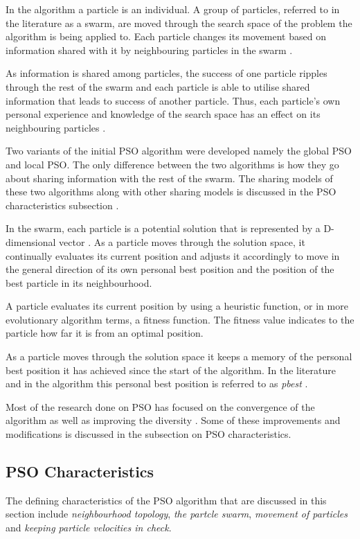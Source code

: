 In the algorithm a particle is an individual. A group of particles, referred to in the literature as a swarm,  are moved through the search space of the problem the algorithm is being applied to. Each particle changes its movement based on information shared with it by neighbouring particles in the swarm \cite{FundamentalSwarm,CompuIntelligenceIntro}. 

As information is shared among particles, the success of one particle ripples through the rest of the swarm and each particle is able to utilise shared information that leads to success of another particle. Thus, each particle's own personal experience and knowledge of the search space has an effect on its neighbouring particles \cite{FundamentalSwarm,CompuIntelligenceIntro}.

Two variants of the initial \gls{PSO} algorithm were developed namely the global \gls{PSO} and local \gls{PSO}. The only difference between the two algorithms is how they go about sharing information with the rest of the swarm. The sharing models of these two algorithms along with other sharing models is discussed in the \gls{PSO} characteristics subsection \cite{SOSwarm}.

In the swarm, each particle is a potential solution that is represented by a D-dimensional vector \cite{PSOHybridJobShop,PSOSelfHierarch}. As a particle moves through the solution space, it continually evaluates its current position and adjusts it accordingly to move in the general direction of its own personal best position and the position of the best particle in its neighbourhood. 

A particle evaluates its current position by using a heuristic function, or in more evolutionary algorithm terms, a fitness function. The fitness value indicates to the particle how far it is from an optimal position\cite{CompuIntelligenceIntro}. 

As a particle moves through the solution space it keeps a memory of the personal best position it has achieved since the start of the algorithm. In the literature and in the algorithm this personal best position is referred to as \emph{pbest} \cite{SOSwarm}.

Most of the research done on \gls{PSO} has focused on the convergence of the algorithm as well as improving the diversity \cite{FundamentalSwarm}. Some of these improvements and modifications is discussed in the subsection on \gls{PSO} characteristics.

\subsection{PSO Characteristics}
\label{sec:psocharacteristics}
The defining characteristics of the \gls{PSO} algorithm that are discussed in this section include \emph{neighbourhood topology}, \emph{the partcle swarm}, \emph{movement of particles} and \emph{keeping particle velocities in check}.
